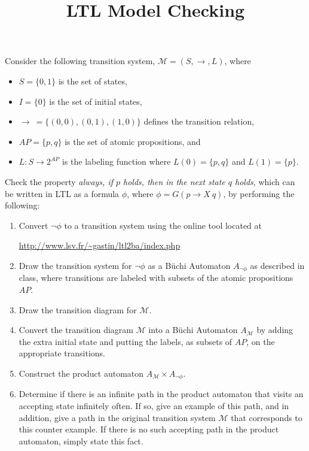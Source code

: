 \documentclass[12pt]{article}
\title{LTL Model Checking}
\date{}
\newenvironment{problem}[2][Problem]{\begin{trivlist}
\item[\hskip \labelsep {\bfseries #1}\hskip \labelsep {\bfseries #2.}]}{\end{trivlist}}
\begin{document}
\maketitle

 
\begin{problem}{2} Consider the following transition system, $\mathcal{M} = (S, \rightarrow, L)$, where 

\begin{itemize} 

\item $S = \{0, 1\}$ is the set of states,

\item $I = \{0\}$ is the set of initial states,

\item $\rightarrow \ = \{(0, 0), (0, 1), (1, 0)\}$
defines the transition relation, 

\item $AP = \{p, q\}$ is the set of atomic propositions, and 

\item $L : S \rightarrow 2^{AP}$ is the labeling function where 
$L(0) = \{p, q\}$ and 
$L(1) = \{p\}$.

\end{itemize}

Check the property \textit{always, if $p$ holds, then in the next state $q$ holds}, which can be written in LTL as a formula $\phi$, where $\phi = G ( p \rightarrow X \ q)$, by performing the following:


\begin{enumerate}[label=\alph*.]
\item Convert $\neg \phi$ to a transition system using the online tool located at

\url{http://www.lsv.fr/~gastin/ltl2ba/index.php}

\item Draw the transition system for $\neg \phi$ as a B\"uchi Automaton $A_{\neg \phi}$ as described in class, where transitions are labeled with subsets of the atomic propositions $AP$.

\item  Draw the transition diagram for $\mathcal{M}$.

\item Convert the transition diagram $\mathcal{M}$ into a B\"uchi Automaton $A_{\mathcal{M}}$ by adding the extra initial state and putting the labels, as subsets of $AP$, on the appropriate transitions.

\item Construct the product automaton $A_{\mathcal{M}} \times A_{\neg \phi}$.

\item Determine if there is an infinite path in the product automaton that visits an accepting state infinitely often. If so, give an example of this path, and in addition, give a path in the original transition system $\mathcal{M}$ that corresponds to this counter example. If there is no such accepting path in the product automaton, simply state this fact. 
\end{enumerate}


\end{problem}
\end{document}
